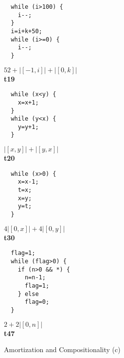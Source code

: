 \documentclass[nocopyrightspace,preprint]{sigplanconf}
\begin{document}
\begin{figure*}[t!]
 \setlength{\progwidth}{.24\linewidth}
  \centering

  \begin{minipage}[b]{\progwidth}
    \begin{center}
   \begin{lstlisting}
  while (i>100) {
    i--;
  }
  i=i+k+50;
  while (i>=0) {
    i--;
  }
   \end{lstlisting}

$52 + |[-1,i]| + |[0,k]|$
\\[.7\baselineskip]
      {\bf t19}
    \end{center}
  \end{minipage}%
%
%
%
  \begin{minipage}[b]{\progwidth}
    \begin{center}
   \begin{lstlisting}
  while (x<y) {
    x=x+1;
  }
  while (y<x) {
    y=y+1;
  }
   \end{lstlisting}

$|[x,y]|+|[y,x]|$
\\[.7\baselineskip]
      {\bf t20}
    \end{center}
  \end{minipage}%
%
%
  \begin{minipage}[b]{\progwidth}
    \begin{center}
   \begin{lstlisting}
  while (x>0) {
    x=x-1;
    t=x;
    x=y;
    y=t;
  }
   \end{lstlisting}

$4|[0,x]|+4|[0,y]|$
\\[.7\baselineskip]
      {\bf t30}
    \end{center}
  \end{minipage}
%
%
  \begin{minipage}[b]{\progwidth}
    \begin{center}
   \begin{lstlisting}
  flag=1;
  while (flag>0) {
    if (n>0 && *) {
      n=n-1;
      flag=1;
    } else
      flag=0;
  }
   \end{lstlisting}

$2 + 2|[0, n]|$
\\[.7\baselineskip]
      {\bf t47}
    \end{center}
  \end{minipage}

   \caption{Amortization and Compositionality (c)}
  \label{fig:cat1c}
\end{figure*}
\end{document}
